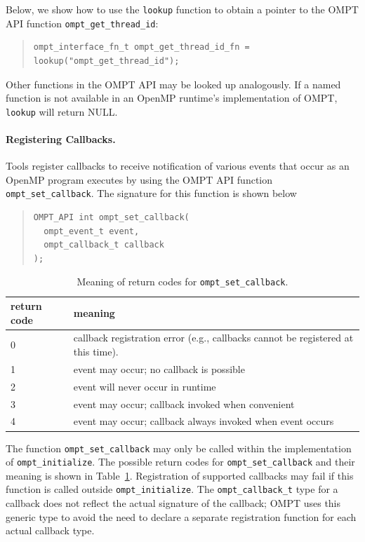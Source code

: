 \documentclass{article}
\begin{document}
Below, we show how to use the \verb|lookup| function to obtain a pointer to the OMPT API function \verb|ompt_get_thread_id|:

\begin{quote}
\begin{verbatim}
ompt_interface_fn_t ompt_get_thread_id_fn = lookup("ompt_get_thread_id");
\end{verbatim}
\end{quote}
Other functions in the OMPT API may be looked up analogously.
If a named function is not available in an OpenMP runtime's implementation of OMPT, \verb|lookup| will return NULL.

\paragraph{Registering Callbacks.} 
Tools register callbacks to receive notification of various events that occur as an OpenMP program executes by using the OMPT API function \verb|ompt_set_callback|. The signature for this function is shown below{
 
\begin{quote}
\begin{verbatim}
OMPT_API int ompt_set_callback(
  ompt_event_t event, 
  ompt_callback_t callback
);
\end{verbatim}
\end{quote}
}

\begin{table}
\centering
\begin{tabular}{|l|l|}
\hline
return code & meaning \\\hline
0 & callback registration error (e.g., callbacks cannot be registered at this time).\\\hline
1 & event may occur; no callback is possible\\\hline
2 & event will never occur in runtime\\\hline
3 & event may occur; callback invoked when convenient\\\hline
4 & event may occur; callback always invoked when event occurs\\\hline
\end{tabular}
\caption{Meaning of return codes for {\tt ompt\_set\_callback}.}
\label{table:set_rc}
\end{table}

\noindent
The  function \verb|ompt_set_callback|  may only be called within the implementation of 
 \verb|ompt_initialize|.
The possible return codes for \verb|ompt_set_callback| and their meaning is shown in Table~\ref{table:set_rc}. 
Registration of supported callbacks may fail if this function is
called outside  \verb|ompt_initialize|.
The \verb|ompt_callback_t| type for a callback does not reflect the actual signature of the callback; OMPT uses  this generic type 
 to avoid the need to declare a separate registration function for each actual callback type.
\end{document}
